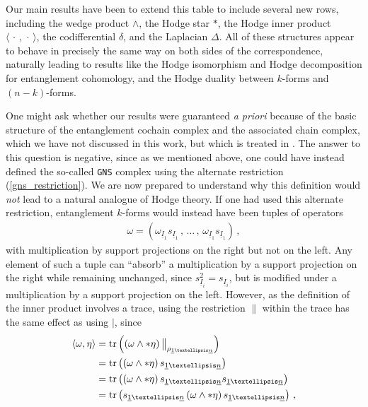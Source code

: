 \documentclass[12pt]{article}
\newcommand{\ul}[1]{{\underline{#1}}}
\numberwithin{equation}{section}
\newcommand{\soneton}{{s_{\ul{1} \ldots \ul{n}}}}
\newcommand{\rhooneton}{{\rho_{\ul{1} \ldots \ul{n}}}}
\begin{document}
Our main results have been to extend this table to include several new rows, including the wedge product $\wedge$, the Hodge star $\ast$, the Hodge inner product $\langle \, \cdot \, , \, \cdot \, \rangle$, the codifferential $\delta$, and the Laplacian $\Delta$. All of these structures appear to behave in precisely the same way on both sides of the correspondence, naturally leading to results like the Hodge isomorphism and Hodge decomposition for entanglement cohomology, and the Hodge duality between $k$-forms and $(n-k)$-forms.


One might ask whether our results were guaranteed \emph{a priori} because of the basic structure of the entanglement cochain complex and the associated chain complex, which we have not discussed in this work, but which is treated in \cite{Mainiero:2019enr}. The answer to this question is negative, since as we mentioned above, one could have instead defined the so-called \texttt{GNS} complex using the alternate restriction (\ref{gns_restriction}). We are now prepared to understand why this definition would \emph{not} lead to a natural analogue of Hodge theory. If one had used this alternate restriction, entanglement $k$-forms would instead have been tuples of operators
%
\begin{align}\label{omega_other_restriction}
    \omega = \left( \omega_{\ul{I}_1} s_{\ul{I}_1} \, , \, \ldots \, , \, \omega_{\ul{I}_1} s_{\ul{I}_1}  \right) \, ,
\end{align}
%
with multiplication by support projections on the right but not on the left. Any element of such a tuple can ``absorb'' a multiplication by a support projection on the right while remaining unchanged, since $s_{\ul{I}_i}^2 = s_{\ul{I}_i}$, but is modified under a multiplication by a support projection on the left. However, as the definition of the inner product involves a trace, using the restriction $\big\|$ within the trace has the same effect as using $\big\vert$, since
%
\begin{align}
    \langle \omega, \eta \rangle &= \tr \left( \left( \omega \wedge \ast \eta \right) \big\|_{\rhooneton} \right) \nonumber \\
    &= \tr \left( \left( \omega \wedge \ast \eta \right) \soneton \right) \nonumber \\
    &= \tr \left( \left( \omega \wedge \ast \eta \right) \soneton \soneton \right) \nonumber \\
    &= \tr \left( \soneton \left( \omega \wedge \ast \eta \right) \soneton \right) \, ,
\end{align}
\end{document}
